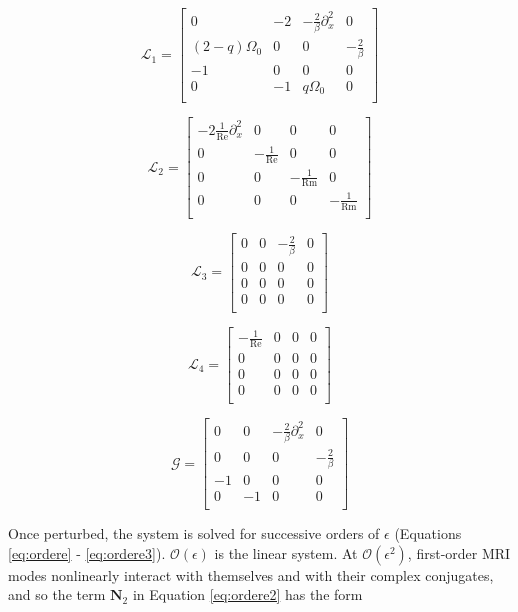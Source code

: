 \documentclass{emulateapj}
\newcommand{\beq}{\begin{equation}}
\newcommand{\eeq}{\end{equation}}
\newcommand\reye{\mathrm{Re}}
\newcommand\reym{\mathrm{Rm}}
\begin{document}
\beq
\mathcal{L}_1 = \left[\begin{matrix}
0 & -2 & -\frac{2}{\beta}\partial_x^2 & 0 \\
(2-q)\Omega_0 & 0 & 0 & -\frac{2}{\beta} \\
-1 & 0 & 0 & 0 \\
0 & -1 & q\Omega_0 & 0 \\ \end{matrix}\right] 
\eeq

\beq
\mathcal{L}_2 = \left[\begin{matrix}
-2\frac{1}{\reye} \partial_x^2 & 0 & 0 & 0 \\
0 & -\frac{1}{\reye} & 0 & 0 \\
0 & 0 & -\frac{1}{\reym} & 0 \\
0 & 0 & 0 & -\frac{1}{\reym} \\ \end{matrix}\right]
\eeq

\beq
\mathcal{L}_3 = \left[\begin{matrix}
0 & 0 & -\frac{2}{\beta} & 0 \\
0 & 0 & 0 & 0 \\
0 & 0 & 0 & 0 \\
0 & 0 & 0 & 0 \\ \end{matrix} \right]
\eeq

\beq
\mathcal{L}_4 = \left[\begin{matrix}
-\frac{1}{\reye} & 0 & 0 & 0 \\
0 & 0 & 0 & 0 \\
0 & 0 & 0 & 0 \\
0 & 0 & 0 & 0 \\ \end{matrix}\right] 
\eeq

\beq
\mathcal{G} = \left[\begin{matrix}
0 & 0 & -\frac{2}{\beta}\partial_x^2 & 0 \\
0 & 0 & 0 & -\frac{2}{\beta} \\
-1 & 0 & 0 & 0 \\
0 & -1 & 0 & 0 \\ \end{matrix} \right]
\eeq

Once perturbed, the system is solved for successive orders of $\epsilon$ (Equations \ref{eq:ordere} - \ref{eq:ordere3}). $\mathcal{O}(\epsilon)$ is the linear system. At $\mathcal{O}(\epsilon^2)$, first-order MRI modes nonlinearly interact with themselves and with their complex conjugates, and so the term $\mathbf{N}_2$ in Equation \ref{eq:ordere2} has the form
\end{document}
